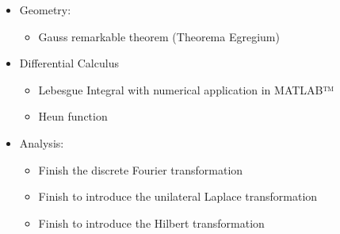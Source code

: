 \begin{itemize}
\begin{itemize}
				\item Canonical Analysis
				\item Tucker's Inter-battery factor analysis
				\item PLS regression (partial least squares)
				\item Two-Stage Least Squares (2SLS) regression
				\item Logic regression
				\item Adjusted Chi-squared
				\item Schoenfeld residuals 
				\item Jarque-Bera test
				\item Dixon, Grubbs, Chi-square outliers tests
				\item Somers'd rank coefficient
				\item Kaplan-Meier sample size\footnote{Sample size calculation: Survival analysis (logrank test)}
				\item Weighted PCA
				\item Bayesian ANOVA
				\item Bayesian one sample T-test
				\item Bayesian binomial test
				\item Bayesian multinomial test
				\item Bayesian Mann-Withney test
				\item Bayesian correlation
				\item Bayesian contingency tables
			\end{itemize}
		\item Geometry:
			\begin{itemize}
				\item Gauss remarkable theorem (Theorema Egregium)
			\end{itemize}
		\item Differential Calculus
			\begin{itemize}
				\item Lebesgue Integral with numerical application in MATLAB™
				\item Heun function
			\end{itemize}
		\item Analysis: 
			\begin{itemize}
				\item Finish the discrete Fourier transformation
				\item Finish to introduce the unilateral Laplace transformation
				\item Finish to introduce the Hilbert transformation

\end{itemize}
\end{itemize}
